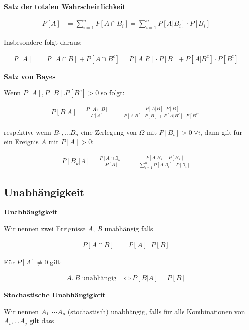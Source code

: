 \documentclass[25pt]{sciposter}
\newenvironment{method}[1]{\begin{mdframed}[backgroundcolor=blue!10,innertopmargin=15pt, innerbottommargin=15pt,nobreak=true]
		\textbf{#1 }
	}
	{ 
	\end{mdframed}
}
\newenvironment{thm}[1]{\begin{mdframed}[backgroundcolor=pink!20,innertopmargin=15pt, innerbottommargin=15pt, nobreak=true]
		\textbf{#1 }
	}
	{ 
	\end{mdframed}
}
\begin{document}
\begin{multicols}{3}
\begin{thm}{Satz der totalen Wahrscheinlichkeit}
			\begin{align*}
				P[A] &= \sum_{i=1}^{n} P[A\cap B_i] = \sum_{i=1}^{n} P[A|B_i]\cdot P[B_i]
			\end{align*}
			
			Insbesondere folgt daraus:
			
			\begin{align*}
				P[A] &= P[A\cap B] + P[A \cap B^c] = P[A|B]\cdot P[B] + P[A|B^c]\cdot P[B^c]
			\end{align*}
		\end{thm}
		
		
		\begin{thm}{Satz von Bayes}
			Wenn $P[A],P[B].P[B^c]> 0$ so folgt:
			
			\begin{align*}
				P[B|A] = \frac{P[A\cap B]}{P[A]} &= \frac{P[A|B]\cdot P[B]}{P[A|B]\cdot P[B] + P[A|B^c]\cdot P[B^c]}
			\end{align*}
			
			respektive wenn $B_1, \ldots B_n$ eine Zerlegung von $\Omega$ mit $P[B_i]>0 \  \forall i$, dann gilt für ein Ereignis $A$ mit $P[A]>0$:
			
			\begin{align*}
				P[B_k|A] = \frac{P[A\cap B_k]}{P[A]} &= \frac{P[A|B_k]\cdot P[B_k]}{\sum_{i=1}^{n} P[A|B_i] \cdot P[B_i] }
			\end{align*}
		\end{thm}
		
		
		\subsection*{Unabhängigkeit}
		
		\begin{method}{Unabhängigkeit}
			Wir nennen zwei Ereignisse $A$, $B$ unabhängig falls
			
			\begin{align*}
				P[A\cap B] &= P[A] \cdot P[B]
			\end{align*}
			
			Für $P[A] \neq 0$ gilt:
			
			\begin{align*}
				\text{$A,B$ unabhängig} &\iff P[B|A] = P[B]
			\end{align*}
			
			
		\end{method}
		
		\begin{method}{Stochastische Unabhängigkeit}
			Wir nennen $A_1,\cdots A_n$ (stochastisch) unabhängig, falls für alle Kombinationen von $A_i, \ldots A_j$ gilt dass
			

\end{method}
\end{multicols}
\end{document}
